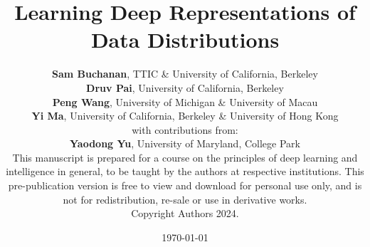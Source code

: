 \documentclass{book}
\begin{document}
\title{Learning Deep Representations of Data Distributions}

\author{\vspace{0.5cm}
    \textbf{Sam Buchanan}, TTIC \& University of California, Berkeley \vspace{3mm}\\
    \textbf{Druv Pai}, University of California, Berkeley \vspace{3mm} \\
    \textbf{Peng Wang}, University of Michigan \& 
    University of Macau  \vspace{3mm} \\
    \textbf{Yi Ma},   University of California, Berkeley \& University of Hong Kong \vspace{10mm}\\
    with contributions from:\vspace{3mm}\\
    \textbf{Yaodong Yu},  University of Maryland, College Park
	\vspace{8cm}\\
	\footnotesize
	This manuscript is prepared for a course on the principles of deep learning and intelligence in general, to be taught by the authors at respective institutions. This pre-publication version is free to view and download for personal use only, and is not for redistribution, re-sale or use in derivative works.\\  Copyright Authors 2024.
}

\date{\large \today}

\frontmatter
\titlepage
\thispagestyle{empty}
\maketitle
\cleardoublepage

% 

% 
\end{document}
